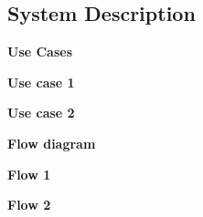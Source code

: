 \subsection{System Description}

\textbf{Use Cases}\\
 \vspace{12pt}

\textbf{Use case 1}\\
 \vspace{12pt}

\textbf{Use case 2}\\
 \vspace{12pt}

\textbf{Flow diagram}\\
 \vspace{12pt}

\textbf{Flow 1}\\
 \vspace{12pt}

\textbf{Flow 2}\\
 \vspace{12pt}
